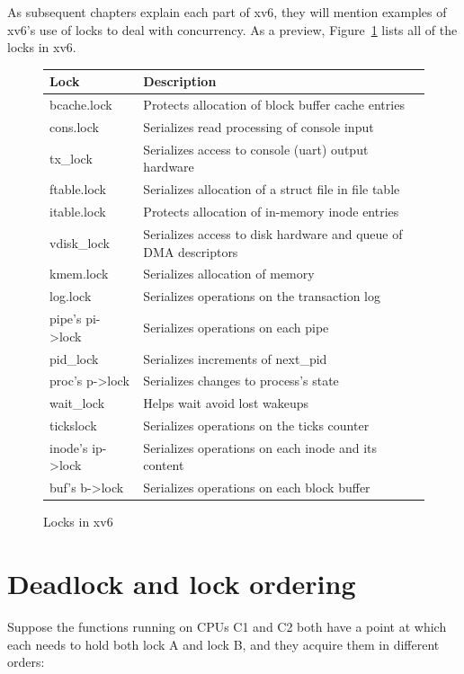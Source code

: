 As subsequent chapters explain each part of xv6, they
will mention examples of xv6's use of locks
to deal with concurrency.
As a preview,
Figure~\ref{fig:locktable}
lists all of the locks in xv6.

\begin{figure}[t]
\center
\begin{tabular}{ll}
{\bf Lock} & {\bf Description} \\
\midrule
bcache.lock & Protects allocation of block buffer cache entries \\
cons.lock & Serializes read processing of console input \\
tx\_lock & Serializes access to console (uart) output hardware \\
ftable.lock & Serializes allocation of a struct file in file table \\
itable.lock & Protects allocation of in-memory inode entries \\
vdisk\_lock & Serializes access to disk hardware and queue of DMA descriptors \\
kmem.lock & Serializes allocation of memory \\
log.lock & Serializes operations on the transaction log \\
pipe's pi->lock & Serializes operations on each pipe \\
pid\_lock & Serializes increments of next\_pid \\
proc's p->lock & Serializes changes to process's state \\
wait\_lock & Helps wait avoid lost wakeups \\
tickslock & Serializes operations on the ticks counter \\
inode's ip->lock & Serializes operations on each inode and its content \\
buf's b->lock & Serializes operations on each block buffer \\
\end{tabular}
\caption{Locks in xv6}
\label{fig:locktable}
\end{figure}

\newpage
\section{Deadlock and lock ordering}

Suppose the functions running on CPUs C1 and C2 both have a point at
which each needs to hold both lock A and lock B, and they acquire them
in different orders:

